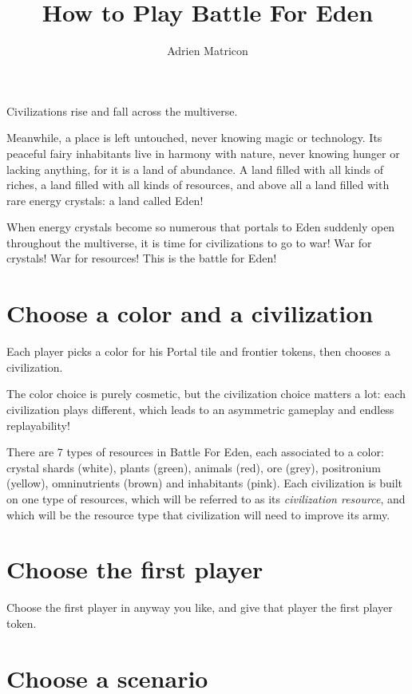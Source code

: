 \documentclass[a4paper]{article}
\author{Adrien Matricon}
\begin{document}
\title{How to Play Battle For Eden}
\maketitle


    Civilizations rise and fall across the multiverse.

    Meanwhile, a place is left untouched, never knowing magic or technology.
    Its peaceful fairy inhabitants live in harmony with nature,
    never knowing hunger or lacking anything, for it is a land of abundance.
    A land filled with all kinds of riches, a land filled with all kinds of resources,
    and above all a land filled with rare energy crystals: a land called Eden!

    When energy crystals become so numerous that portals to Eden suddenly open
    throughout the multiverse, it is time for civilizations to go to war!
    War for crystals! War for resources! This is the battle for Eden!



\section{Choose a color and a civilization}

    Each player picks a color for his Portal tile and frontier tokens,
    then chooses a civilization.
    
    The color choice is purely cosmetic,
    but the civilization choice matters a lot: each civilization plays different,
    which leads to an asymmetric gameplay and endless replayability!
    
    There are 7 types of resources in Battle For Eden,
    each associated to a color:
    crystal shards (white), plants (green), animals (red), ore (grey),
    positronium (yellow), omninutrients (brown) and inhabitants (pink).
    Each civilization is built on one type of resources,
    which will be referred to as its \textit{civilization resource},
    and which will be the resource type that civilization will need
    to improve its army.
    
\section{Choose the first player}
    Choose the first player in anyway you like,
    and give that player the first player token.


\newpage
\section{Choose a scenario}
\end{document}
